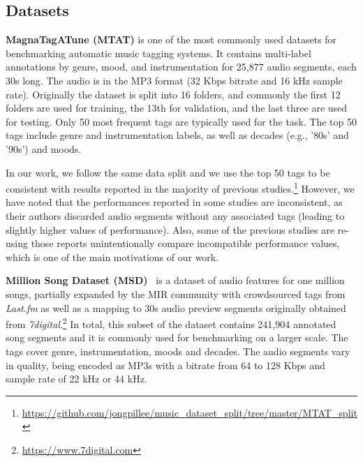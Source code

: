 \documentclass{article}
\begin{document}
\subsection{Datasets}


\noindent\textbf{MagnaTagATune (MTAT)} \cite{law2009evaluation} is one of the most commonly used datasets for benchmarking automatic music tagging systems. It contains multi-label annotations by genre, mood, and instrumentation for 25,877 audio segments, each 30s long. The audio is in the MP3 format (32 Kbps bitrate and 16 kHz sample rate). Originally the dataset is split into 16 folders, and commonly the first 12 folders are used for training, the 13th for validation, and the last three are used for testing. Only 50 most frequent tags are typically used for the task. The top 50 tags include genre and instrumentation labels, as well as decades (e.g., '80s' and '90s') and moods.

In our work, we follow the same data split and we use the top 50 tags to be consistent with results reported in the majority of previous studies.\footnote{\url{https://github.com/jongpillee/music_dataset_split/tree/master/MTAT_split}} However, we have noted that the performances reported in some studies are inconsistent, as their authors discarded audio segments without any associated tags (leading to slightly higher values of performance). Also, some of the previous studies are re-using those reports unintentionally compare incompatible performance values, which is one of the main motivations of our work.



\noindent\textbf{Million Song Dataset (MSD)}~\cite{bertin2011million} is a dataset of audio features for one million songs, partially expanded by the MIR community with crowdsourced tags from \textit{Last.fm} as well as 
a mapping to 30s audio preview segments originally obtained from \textit{7digital}.\footnote{\url{https://www.7digital.com}}  In total, this subset of the dataset contains 241,904 annotated song segments and it is commonly used for benchmarking on a larger scale. The tags cover genre, instrumentation, moods and decades. The audio segments vary in quality, being encoded as MP3s with a bitrate from 64 to 128 Kbps and sample rate of 22 kHz or 44 kHz.
\end{document}
